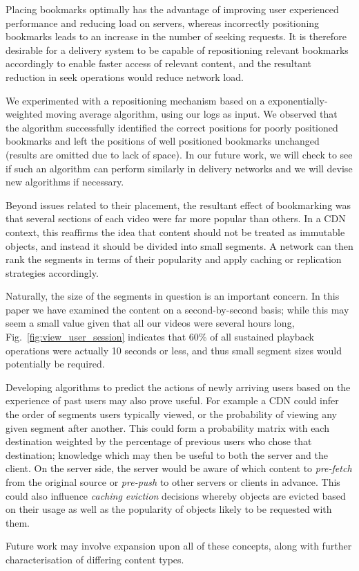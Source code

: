 \documentclass[letterpaper,nocopyrightspace]{sig-alternate}
\begin{document}
Placing bookmarks optimally has the advantage of improving user
experienced performance and reducing load on servers, whereas
incorrectly positioning bookmarks leads to an increase in the number of
seeking requests. It is therefore desirable for a delivery system to
be capable of repositioning relevant bookmarks accordingly to enable
faster access of relevant content, and the resultant reduction in
seek operations would reduce network load.

We experimented with a repositioning mechanism based on a
exponentially-weighted moving average algorithm, using our logs as
input. We observed that the algorithm successfully identified the
correct positions for poorly positioned bookmarks and left the
positions of well positioned bookmarks unchanged (results are
omitted due to lack of space). In our future work, we will check to
see if such an algorithm can perform similarly in delivery networks
and we will devise new algorithms if necessary.


Beyond issues related to their placement, the resultant effect of
bookmarking was that several sections of each video were far more
popular than others. In a CDN context, this reaffirms the idea that
content should not be treated as immutable objects, and instead it
should be divided into small segments. A network can then rank the
segments in terms of their popularity and apply caching or
replication strategies accordingly.

Naturally, the size of the segments in question is an important
concern. In this paper we have examined the content on a
second-by-second basis; while this may seem a small value given that
all our videos were several hours long,
Fig.~\ref{fig:view_user_session} indicates that 60\% of all
sustained playback operations were actually 10 seconds or less, and
thus small segment sizes would potentially be required.

Developing algorithms to predict the actions of newly arriving users
based on the experience of past users may also prove useful. For
example a CDN could infer the order of segments users typically
viewed, or the probability of viewing any given segment after
another. This could form a probability matrix with each destination
weighted by the percentage of previous users who chose that
destination; knowledge which may then be useful to both the server
and the client. On the server side, the server would be aware of
which content to {\em pre-fetch} from the original source or {\em
pre-push} to other servers or clients in advance. This could also
influence {\em caching eviction} decisions whereby objects are
evicted based on their usage as well as the popularity of objects
likely to be requested with them.

Future work may involve expansion upon all of these concepts, along
with further characterisation of differing content types.



\end{document}
